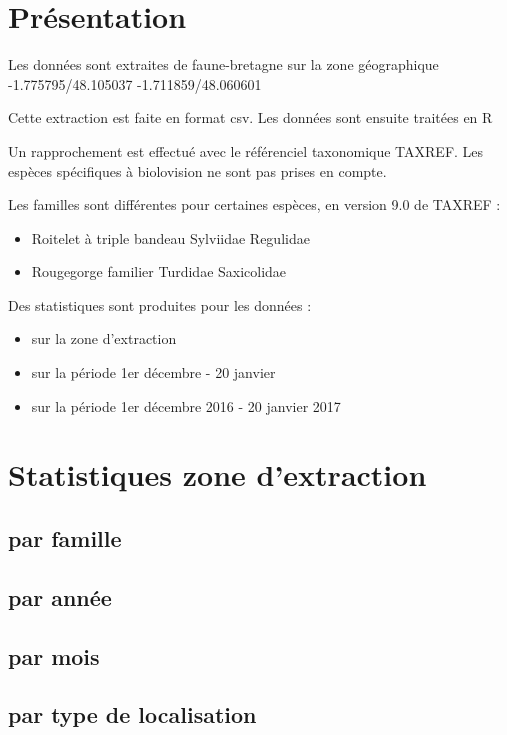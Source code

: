 \renewcommand{\monlhead}{Données ornitho faune-bretagne}
\section*{Présentation}
Les données sont extraites de faune-bretagne sur la zone géographique -1.775795/48.105037 -1.711859/48.060601

Cette extraction est faite en format csv. Les données sont ensuite traitées en R

Un rapprochement est effectué avec le référenciel taxonomique TAXREF.
Les espèces spécifiques à biolovision ne sont pas prises en compte.

Les familles sont différentes pour certaines espèces, en version 9.0 de TAXREF :
\begin{itemize}
\item Roitelet à triple bandeau   Sylviidae   Regulidae
\item Rougegorge familier    Turdidae Saxicolidae
\end{itemize}

Des statistiques sont produites pour les données :
\begin{itemize}
\item sur la zone d'extraction
\item sur la période 1er décembre - 20 janvier
\item sur la période 1er décembre 2016 - 20 janvier 2017
\end{itemize}
\vfill \null
\section*{Statistiques zone d'extraction}
\subsection*{par famille}
\subsection*{par année}
\subsection*{par mois}
\subsection*{par type de localisation}

